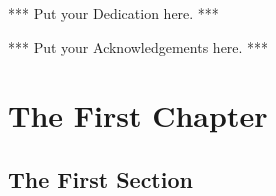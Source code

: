 \begin{preliminary}
 \begin{dedication}
 ***   Put your Dedication here.   ***

 \lipsum[2]
 \end{dedication}

\begin{acknowledgements}
***   Put your Acknowledgements here.   ***

\lipsum[2]
\end{acknowledgements}

\tableofcontents

\listoftables

\listoffigures

\end{preliminary}



\chapter{The First Chapter}
\section{The First Section}
\lipsum[2-4]

